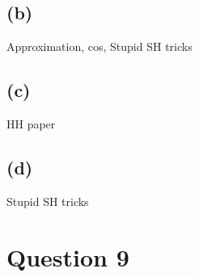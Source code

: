 \documentclass{report}
\begin{document}

\subsection{(b)}
Approximation, cos, Stupid SH tricks
\subsection{(c)}
HH paper
\subsection{(d)}
Stupid SH tricks
\section{Question 9}

{\small


}
\end{document}

